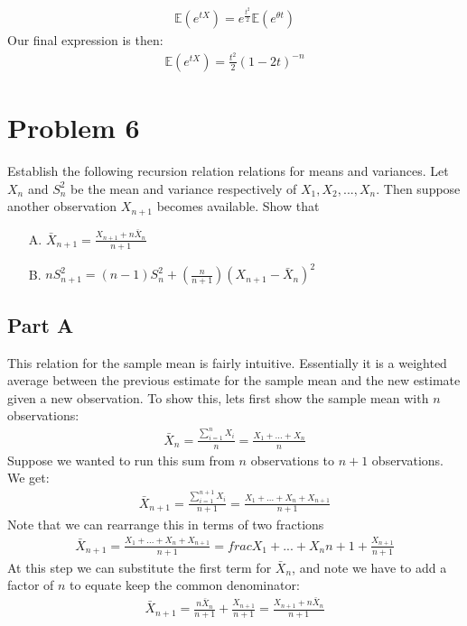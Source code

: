 \documentclass{article}
\begin{document}
\begin{align*}
\mathbb{E}(e^{tX}) = e^{\tfrac{t^2}{2}} \mathbb{E}(e^{\theta t})
\end{align*}
Our final expression is then:
\begin{align*}
\boxed{ \mathbb{E}(e^{tX}) = \tfrac{t^2}{2} (1-2t)^{-n} }
\end{align*}

\clearpage
\section*{Problem 6}
Establish the following recursion relation relations for means and variances. Let $X_n$ and $S_n^2$ be the mean and variance respectively of $X_1,X_2,...,X_n$. Then suppose another observation $X_{n+1}$ becomes available. Show that
\begin{enumerate}
\item[A.] $\bar{X}_{n+1} = \frac{X_{n+1}+n \bar{X}_n}{n+1}$
\item[B.] $nS^2_{n+1} = (n-1)S^2_n + (\tfrac{n}{n+1})(X_{n+1}-\bar{X}_n)^2$
\end{enumerate}
\subsection*{Part A}
This relation for the sample mean is fairly intuitive. Essentially it is a weighted average between the previous estimate for the sample mean and the new estimate given a new observation. To show this, lets first show the sample mean with $n$ observations:
\begin{align*}
\bar{X}_{n} = \frac{\sum_{i=1}^{n} X_i}{n} = \frac{X_1+...+X_n}{n}
\end{align*}
Suppose we wanted to run this sum from $n$ observations to $n+1$ observations. We get:
\begin{align*}
\bar{X}_{n+1} = \frac{\sum_{i=1}^{n+1} X_i}{n+1} = \frac{X_1+...+X_n+X_{n+1}}{n+1}
\end{align*}
Note that we can rearrange this in terms of two fractions
\begin{align*}
\bar{X}_{n+1} = \frac{X_1+...+X_n+X_{n+1}}{n+1} = frac{X_1+...+X_n}{n+1} + \frac{X_{n+1}}{n+1}
\end{align*}
At this step we can substitute the first term for $\bar{X}_n$, and note we have to add a factor of $n$ to equate keep the common denominator:
\begin{align*}
\boxed{ \bar{X}_{n+1} = \frac{n\bar{X}_n}{n+1} + \frac{X_{n+1}}{n+1} = \frac{X_{n+1}+n \bar{X}_n}{n+1} }
\end{align*}
\end{document}
